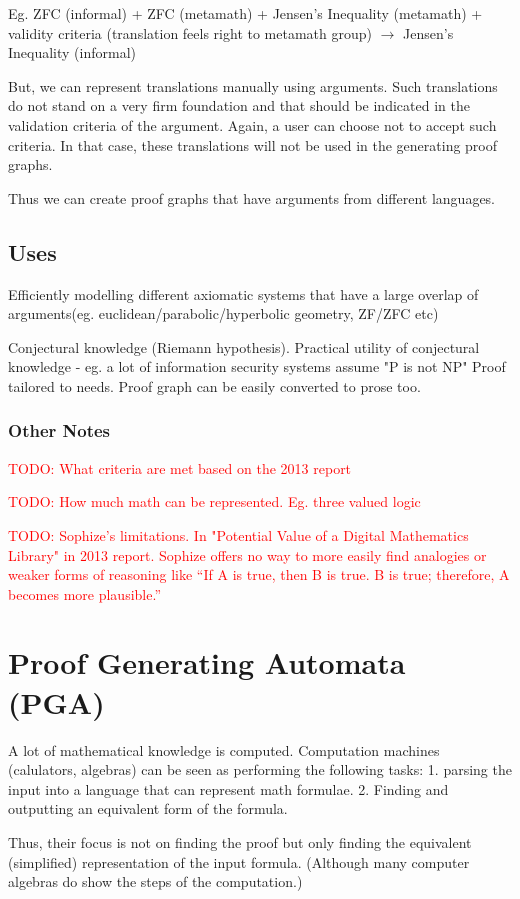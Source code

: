 \documentclass[a4paper]{article}
\newcommand\todo[1]{\textcolor{red}{TODO: #1}}
\begin{document}
Eg. ZFC (informal) + ZFC (metamath) + Jensen's Inequality (metamath) + validity criteria (translation feels right to metamath group) $\rightarrow$ 
Jensen's Inequality (informal)

But, we can represent translations manually using arguments. Such translations do not stand on a very firm foundation and that should be indicated in the validation criteria of the argument. Again, a user can choose not to accept such criteria. In that case, these translations will not be used in the generating proof graphs.


Thus we can create proof graphs that have arguments from different languages.

\subsection{Uses}
Efficiently modelling different axiomatic systems that have a large overlap of arguments(eg. euclidean/parabolic/hyperbolic geometry, ZF/ZFC etc)

Conjectural knowledge (Riemann hypothesis). 
Practical utility of conjectural knowledge - eg. a lot of information security systems assume "P is not NP"
Proof tailored to needs. Proof graph can be easily converted to prose too.

\subsubsection{Other Notes}
\todo{What criteria are met based on the 2013 report}

\todo{How much math can be represented. Eg. three valued logic}

\todo{Sophize's limitations. In "Potential Value of a
Digital Mathematics Library" in 2013 report. Sophize offers no way to more easily find analogies or weaker forms of reasoning like “If A is true, then B is true. B is true; therefore, A becomes more plausible.” }


\section{Proof Generating Automata (PGA)}
A lot of mathematical knowledge is computed. Computation machines (calulators, algebras) can be seen as performing the following tasks: 
1. parsing the input into a language that can represent math formulae. 
2. Finding and outputting an equivalent form of the formula.

Thus, their focus is not on finding the proof but only finding the equivalent (simplified) representation of the input formula. (Although many computer algebras do show the steps of the computation.)
\end{document}
